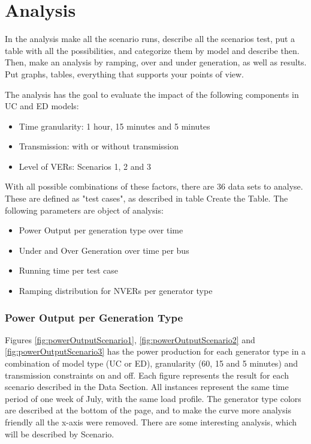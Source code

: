 \documentclass[12pt,LUDisStyle,twosided]{book}
\begin{document}
\chapter{Analysis}

In the analysis make all the scenario runs, describe all the scenarios test, put a table with all the possibilities, and categorize them by model and describe then. Then, make an analysis by ramping, over and under generation, as well as results. Put graphs, tables, everything that supports your points of view.

The analysis has the goal to evaluate the impact of the following components in UC and ED models:

\begin{itemize}
\item Time granularity: 1 hour, 15 minutes and 5 minutes
\item Transmission: with or without transmission
\item Level of VERs: Scenarios 1, 2 and 3
\end{itemize}

With all possible combinations of these factors, there are 36 data sets to analyse. These are defined as "test cases", as described in table Create the Table. The following parameters are object of analysis:

\begin{itemize}
\item Power Output per generation type over time
\item Under and Over Generation over time per bus
\item Running time per test case
\item Ramping distribution for NVERs per generator type
\end{itemize}

\subsection{Power Output per Generation Type}

Figures \ref{fig:powerOutputScenario1}, \ref{fig:powerOutputScenario2} and \ref{fig:powerOutputScenario3} has the power production for each generator type in a combination of model type (UC or ED), granularity (60, 15 and 5 minutes) and transmission constraints on and off. Each figure represents the result for each scenario described in the Data Section. All instances represent the same time period of one week of July, with the same load profile. The generator type colors are described at the bottom of the page, and to make the curve more analysis friendly all the x-axis were removed. There are some interesting analysis, which will be described by Scenario.
\end{document}
